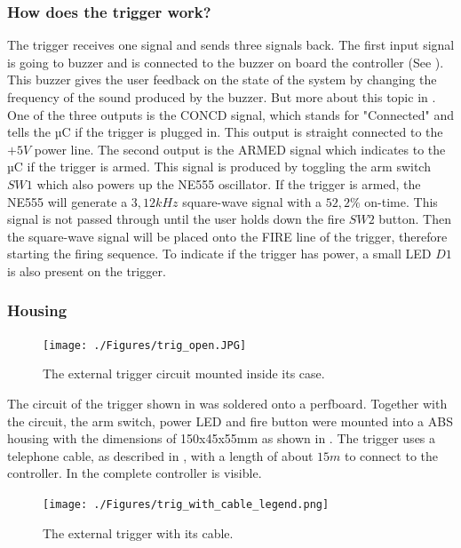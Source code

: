 \pagebreak

\subsubsection{How does the trigger work?}
The trigger receives one signal and sends three signals back. The first 
input signal is going to buzzer and is connected to the buzzer on board the controller (See ). This buzzer gives the user feedback on the state of the system by changing the frequency of the sound produced by the buzzer. But more about this topic in . One of the three outputs is the CONCD signal, which stands for "Connected" and tells the µC if the trigger is plugged in. This output is straight connected to the $+5V$ power line.
The second output is the ARMED signal which indicates to the µC if the trigger is armed. This signal is produced by toggling the arm switch $SW1$ which also powers up the NE555 oscillator. If the trigger is armed, the NE555 will generate a $3,12kHz$ square-wave signal with a $52,2\%$ on-time. This signal is not passed through until the user holds down the fire $SW2$ button. Then the square-wave signal will be placed onto the FIRE line of the trigger, therefore starting the firing sequence. To indicate if the trigger has power, a small LED $D1$ is also present on the trigger.

\subsubsection{Housing}

\begin{figure}[!ht]
    \centering
    \texttt{[image: ./Figures/trig\_open.JPG]}
    \caption{The external trigger circuit mounted inside its case.}
    \label{fig:trig_open}     
\end{figure}

\noindent The circuit of the trigger shown in  was soldered onto a perfboard. Together with the circuit, the arm switch, power LED and fire button were mounted into a ABS housing with the dimensions of 150x45x55mm as shown in . The trigger uses a telephone cable, as described in , with a length of about $15m$ to connect to the controller. In  the complete controller is visible.

\begin{figure}[!ht]
    \centering
    \texttt{[image: ./Figures/trig\_with\_cable\_legend.png]}
    \caption{The external trigger with its cable.}
    \label{fig:trig_with_cable_legend}     
\end{figure}

